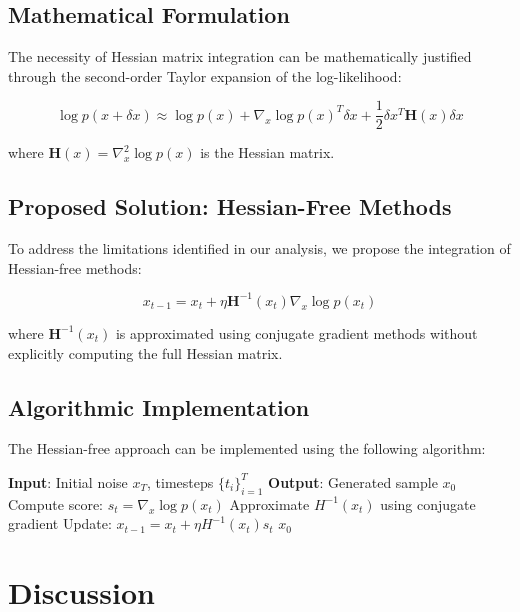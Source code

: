 \documentclass[11pt]{article}
\begin{document}
\subsection{Mathematical Formulation}
The necessity of Hessian matrix integration can be mathematically justified through the second-order Taylor expansion of the log-likelihood:

\begin{equation}
\log p(x + \delta x) \approx \log p(x) + \nabla_x \log p(x)^T \delta x + \frac{1}{2} \delta x^T \mathbf{H}(x) \delta x
\end{equation}

where $\mathbf{H}(x) = \nabla_x^2 \log p(x)$ is the Hessian matrix.

\subsection{Proposed Solution: Hessian-Free Methods}
To address the limitations identified in our analysis, we propose the integration of Hessian-free methods:

\begin{equation}
x_{t-1} = x_t + \eta \mathbf{H}^{-1}(x_t) \nabla_x \log p(x_t)
\end{equation}

where $\mathbf{H}^{-1}(x_t)$ is approximated using conjugate gradient methods without explicitly computing the full Hessian matrix.

\subsection{Algorithmic Implementation}
The Hessian-free approach can be implemented using the following algorithm:

\begin{algorithm}
\caption{Hessian-Free DDIM Sampling}
\begin{algorithmic}[1]
\STATE \textbf{Input}: Initial noise $x_T$, timesteps $\{t_i\}_{i=1}^T$
\STATE \textbf{Output}: Generated sample $x_0$
    \STATE Compute score: $s_t = \nabla_x \log p(x_t)$
    \STATE Approximate $H^{-1}(x_t)$ using conjugate gradient
    \STATE Update: $x_{t-1} = x_t + \eta H^{-1}(x_t) s_t$
\ENDFOR
\RETURN $x_0$
\end{algorithmic}
\end{algorithm}

\section{Discussion}
\end{document}
